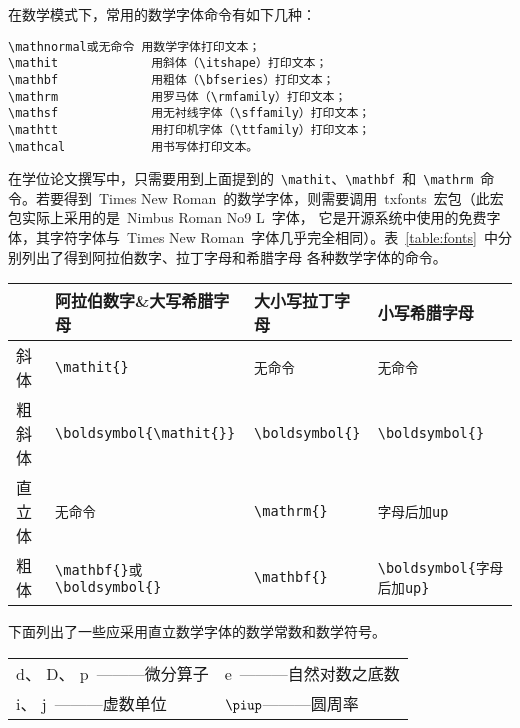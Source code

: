 在数学模式下，常用的数学字体命令有如下几种：
\begin{verbatim}
\mathnormal或无命令 用数学字体打印文本；
\mathit             用斜体（\itshape）打印文本；
\mathbf             用粗体（\bfseries）打印文本；
\mathrm             用罗马体（\rmfamily）打印文本；
\mathsf             用无衬线字体（\sffamily）打印文本；
\mathtt             用打印机字体（\ttfamily）打印文本；
\mathcal            用书写体打印文本。
\end{verbatim}
在学位论文撰写中，只需要用到上面提到的~\verb|\mathit|、\verb|\mathbf|~和~\verb|\mathrm|~命令。若要得到~Times New Roman~的数学字体，则需要调用~txfonts~宏包（此宏包实际上采用的是~Nimbus Roman No9 L~字体，
它是开源系统中使用的免费字体，其字符字体与~Times New Roman~字体几乎完全相同）。表~\ref{table:fonts}~中分别列出了得到阿拉伯数字、拉丁字母和希腊字母
各种数学字体的命令。
\begin{table}[htbp]
	\vspace{0.5em}\centering\wuhao
	\begin{tabular}{llll}
		\toprule
		& 阿拉伯数字\&大写希腊字母 & 大小写拉丁字母 & 小写希腊字母  \\
		\midrule
		斜体 & \verb|\mathit{}| & \verb|无命令| & \verb|无命令|\\
		粗斜体 & \verb|\boldsymbol{\mathit{}}| & \verb|\boldsymbol{}| & \verb|\boldsymbol{}|\\
		直立体 & \verb|无命令| & \verb|\mathrm{}| & \verb|字母后加up|\\
		粗体 & \verb|\mathbf{}或\boldsymbol{}| & \verb|\mathbf{}| & \verb|\boldsymbol{字母后加up}|\\
		\bottomrule
	\end{tabular}
\end{table}

\noindent 下面列出了一些应采用直立数学字体的数学常数和数学符号。

\vspace{-0.5em}\begin{center}\begin{tabularx}{0.7\textwidth}{XX}
		$\mathrm{d}$、 $\mathrm{D}$、 $\mathrm{p}$~———微分算子 & $\mathrm{e}$~———自然对数之底数\\
		$\mathrm{i}$、 $\mathrm{j}$~———虚数单位 & $\piup$———圆周率\\
	\end{tabularx}\end{center}
	
